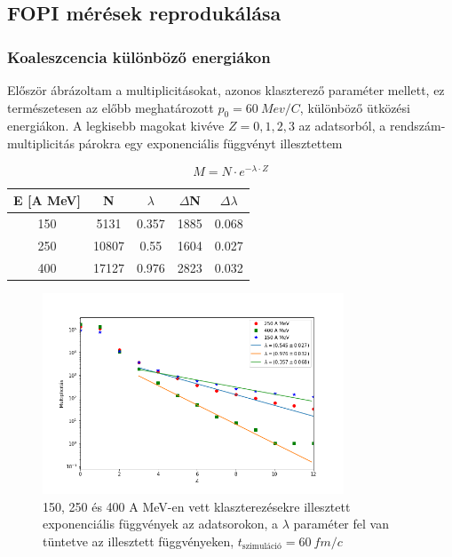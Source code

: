 \documentclass[a4paper,12pt]{article}
\begin{document}
\vspace{5mm}

\subsection{ FOPI mérések reprodukálása}

\vspace{5mm}

\subsubsection{ Koaleszcencia különböző energiákon}

\vspace{5mm}

\par Először ábrázoltam a multiplicitásokat, azonos klaszterező paraméter mellett, ez természetesen az előbb meghatározott $p_{0} = 60 ~Mev/C$, különböző ütközési energiákon. A legkisebb magokat kivéve $Z = 0, 1, 2, 3$ az adatsorból, a rendszám-multiplicitás párokra egy exponenciális függvényt illesztettem

\vspace{5mm}

\begin{equation*}
M = N\cdot e^{-\lambda\cdot Z}
\end{equation*}

\vspace{5mm}

\begin{center}
\begin{tabular}{|c|c|c|c|c|}
\hline
E [A MeV] & N & $\lambda$ & $\Delta$N & $\Delta\lambda$ \\
\hline
150 & 5131 & 0.357 & 1885 & 0.068 \\
\hline
250 & 10807 & 0.55 & 1604 & 0.027 \\
\hline
400 & 17127 & 0.976 & 2823 & 0.032 \\
\hline
\end{tabular}
\end{center}

\vspace{3mm}

\begin{figure}[H]
\centering
\includegraphics[width=0.8\textwidth]{./p006_250_400_fit.png}
\caption{150, 250 és 400 A MeV-en vett klaszterezésekre illesztett exponenciális függvények az adatsorokon, a $\lambda$ paraméter fel van tüntetve az illesztett függvényeken, $t_{\text{szimuláció}} = 60 ~fm/c$}
\end{figure}
\end{document}
